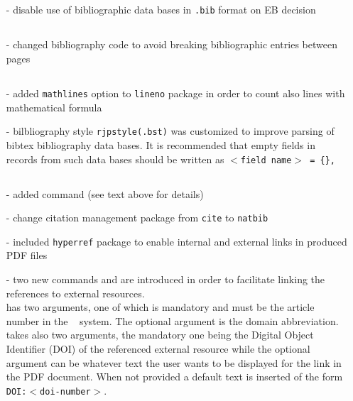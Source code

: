 \documentclass[myclassdoc,debug]{rjparticle}
\begin{document}
\subsection{}
\begin{itemize}
\item[-] disable use of bibliographic data bases in \texttt{.bib} format on EB decision
\end{itemize}

\subsection{}
\begin{itemize}
\item[-] changed bibliography code to avoid breaking bibliographic entries between pages
\end{itemize}

\subsection{}
\begin{itemize}
  \item[-] added \texttt{mathlines} option to \texttt{lineno} package in order to count also lines with mathematical formula
  \item[-] bilbliography style \texttt{rjpstyle(.bst)} was customized to improve parsing of bibtex bibliography data bases. It is recommended that empty fields in records from such data bases should be written as \texttt{$<$field name$>$ = \{\},}
\end{itemize}

\subsection{}
\begin{itemize}
  \item[-] added  command (see text above for details)
  \item[-] change citation management package from \texttt{cite} to \texttt{natbib}
  \item[-] included \texttt{hyperref} package to enable internal and external links in produced PDF files
  \item[-] two new commands  and  are introduced in order to facilitate linking the references to external resources.\\
   has two arguments, one of which is mandatory and must be the article number in the \earXiv~ system. The optional argument is the 
  domain abbreviation. \\
   takes also two arguments, the mandatory one being the Digital Object Identifier (DOI) of the referenced external resource while the optional argument can be whatever text the user wants to be displayed for the link in the PDF document. When not provided a default text is inserted of the form \texttt{DOI:$<$doi-number$>$}.
\end{itemize}
\end{document}
